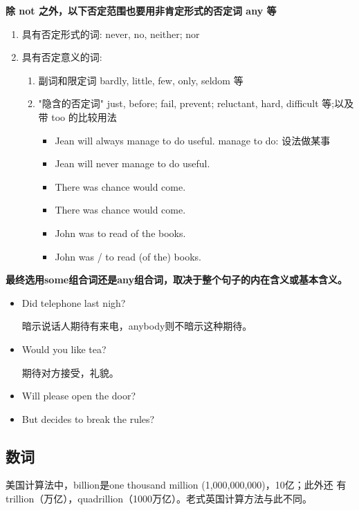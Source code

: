 \textbf{除 not 之外，以下否定范围也要用非肯定形式的否定词 any 等}
\begin{enumerate}
\item 具有否定形式的词: never, no, neither; nor
\item 具有否定意义的词:
  \begin{enumerate}
  \item 副词和限定词 bardly, little, few, only, seldom 等
  \item "隐含的否定词" just, before; fail, prevent; reluctant, hard, difficult
    等;以及带 too 的比较用法
    \begin{itemize}
    \item Jean will always manage to do  useful. manage to do:
      设法做某事
    \item Jean will never manage to do  useful.
    \item There was  chance  would come.
    \item There was  chance  would come.
    \item John was  to read  of the books.
    \item John was / to read  (of the) books.
    \end{itemize}
  \end{enumerate}
\end{enumerate}

\textbf{最终选用some组合词还是any组合词，取决于整个句子的内在含义或基本含义。}
\begin{itemize}
\item Did  telephone last nigh?

  暗示说话人期待有来电，anybody则不暗示这种期待。

\item Would you like  tea?

  期待对方接受，礼貌。

\item Will  please open the door?


\item But   decides to break the
  rules?
\end{itemize}


\subsection{数词}
美国计算法中，billion是one thousand million (1,000,000,000)，10亿；此外还
有trillion（万亿），quadrillion（1000万亿）。老式英国计算方法与此不同。


